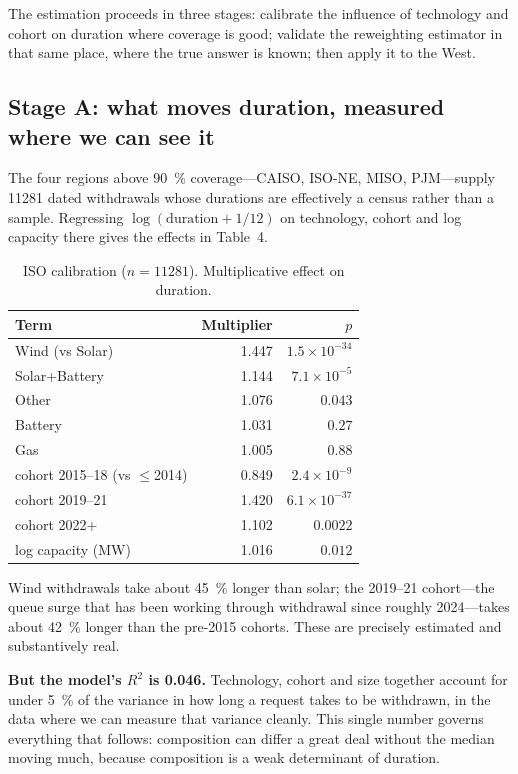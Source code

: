 \documentclass[11pt,a4paper]{article}
\begin{document}
The estimation proceeds in three stages: calibrate the influence of technology
and cohort on duration where coverage is good; validate the reweighting estimator
in that same place, where the true answer is known; then apply it to the West.

\subsection{Stage A: what moves duration, measured where we can see it}

The four regions above \SI{90}{\percent} coverage---CAISO, ISO-NE, MISO,
PJM---supply \num{11281} dated withdrawals whose durations are effectively a
census rather than a sample. Regressing $\log(\text{duration} + 1/12)$ on
technology, cohort and log capacity there gives the effects in Table~4.

\begin{table}[htbp]
\centering
\caption{ISO calibration ($n = \num{11281}$). Multiplicative effect on duration.}
\begin{tabular}{lrr}
\toprule
Term & Multiplier & $p$ \\
\midrule
Wind (vs Solar)            & 1.447 & $1.5\times10^{-34}$ \\
Solar+Battery              & 1.144 & $7.1\times10^{-5}$ \\
Other                      & 1.076 & $0.043$ \\
Battery                    & 1.031 & $0.27$ \\
Gas                        & 1.005 & $0.88$ \\
cohort 2015--18 (vs $\leq$2014) & 0.849 & $2.4\times10^{-9}$ \\
cohort 2019--21            & 1.420 & $6.1\times10^{-37}$ \\
cohort 2022+               & 1.102 & $0.0022$ \\
log capacity (MW)          & 1.016 & $0.012$ \\
\bottomrule
\end{tabular}
\end{table}
\FloatBarrier

Wind withdrawals take about \SI{45}{\percent} longer than solar; the 2019--21
cohort---the queue surge that has been working through withdrawal since roughly
2024---takes about \SI{42}{\percent} longer than the pre-2015 cohorts. These are
precisely estimated and substantively real.

\textbf{But the model's $R^2$ is 0.046.} Technology, cohort and size together
account for under \SI{5}{\percent} of the variance in how long a request takes to
be withdrawn, in the data where we can measure that variance cleanly. This single
number governs everything that follows: composition can differ a great deal
without the median moving much, because composition is a weak determinant of
duration.
\end{document}
